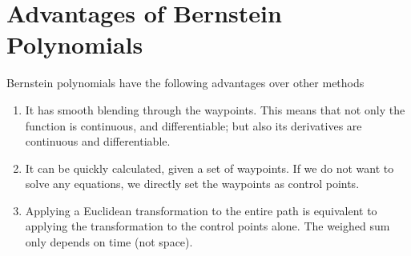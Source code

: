 \section{Advantages of Bernstein Polynomials}

Bernstein polynomials have the following advantages over other methods

\begin{enumerate}
    \item It has smooth blending through the waypoints. This means that not only the function is continuous, and differentiable; but also its derivatives are continuous and differentiable.
    \item It can be quickly calculated, given a set of waypoints. If we do not want to solve any equations, we directly set the waypoints as control points.
    \item Applying a Euclidean transformation to the entire path is equivalent to applying the transformation to the control points alone. The weighed sum only depends on time (not space).
\end{enumerate}
